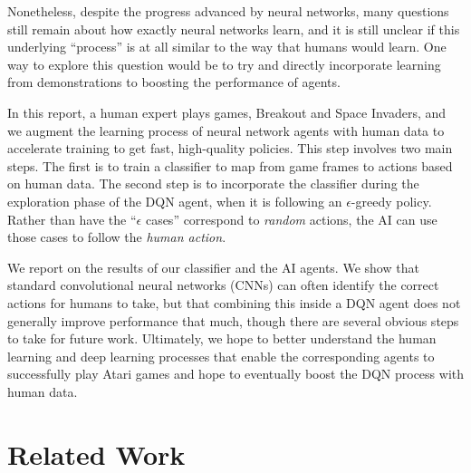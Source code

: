 \documentclass[letterpaper, 10pt, conference]{ieeeconf}
\begin{document}
Nonetheless, despite the progress advanced by neural networks, many questions
still remain about how exactly neural networks learn, and it is still unclear if
this underlying ``process'' is at all similar to the way that humans would
learn. One way to explore this question would be to try and directly incorporate
learning from demonstrations to boosting the performance of agents.

In this report, a human expert plays games, Breakout and Space Invaders, and we
augment the learning process of neural network agents with human data to
accelerate training to get fast, high-quality policies. This step involves two
main steps. The first is to train a classifier to map from game frames to
actions based on human data. The second step is to incorporate the classifier
during the exploration phase of the DQN agent, when it is following an
$\epsilon$-greedy policy. Rather than have the ``$\epsilon$ cases'' correspond
to \emph{random} actions, the AI can use those cases to follow the \emph{human
action}.

We report on the results of our classifier and the AI agents. We show that
standard convolutional neural networks (CNNs) can often identify the correct
actions for humans to take, but that combining this inside a DQN agent does not
generally improve performance that much, though there are several obvious
steps to take for future work. Ultimately, we hope to better understand the
human learning and deep learning processes that enable the corresponding
agents to successfully play Atari games and hope to eventually boost the DQN
process with human data.


\section{Related Work}\label{sec:related_work}
\end{document}
